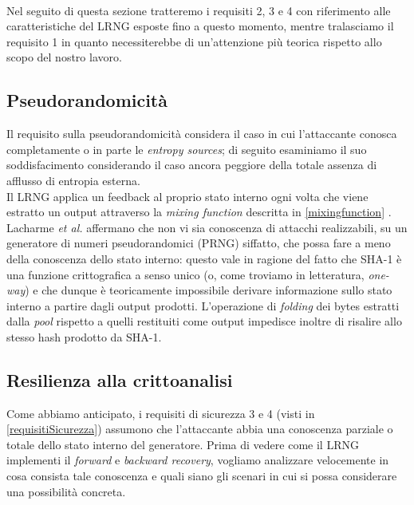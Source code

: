 \documentclass{article}
\begin{document}
 
 \paragraph{}Nel seguito di questa sezione tratteremo i requisiti 2, 3 e 4 con
 riferimento alle caratteristiche del LRNG esposte fino a questo momento,
 mentre tralasciamo il requisito 1 in quanto necessiterebbe di
 un'attenzione più teorica rispetto allo scopo del nostro lavoro.
 
 \subsection{Pseudorandomicità}
 Il requisito sulla pseudorandomicità considera il caso in cui l'attaccante
 conosca completamente o in parte le \emph{entropy sources}; di seguito
 esaminiamo il suo soddisfacimento considerando il caso ancora peggiore della
 totale assenza di afflusso di entropia esterna.\\
 Il LRNG applica un feedback al proprio stato interno ogni volta che viene
 estratto un output attraverso la \emph{mixing function} descritta in
 \ref{mixingfunction} . Lacharme \emph{et al.} affermano che non vi sia
 conoscenza di attacchi realizzabili, su un generatore di numeri pseudorandomici
 (PRNG) siffatto, che possa fare a meno della conoscenza dello stato interno:
 questo vale in ragione del fatto che SHA-1 è una funzione crittografica a senso
 unico (o, come troviamo in letteratura, \emph{one-way}) e che dunque è teoricamente
 impossibile derivare informazione sullo stato interno
 a partire dagli output prodotti. L'operazione di \emph{folding} dei bytes
 estratti dalla \emph{pool} rispetto a quelli restituiti come output impedisce
 inoltre di risalire allo stesso hash prodotto da SHA-1.
 
 \subsection{Resilienza alla crittoanalisi}
 Come abbiamo anticipato, i requisiti di sicurezza 3 e 4 (visti in
 \ref{requisitiSicurezza}) assumono che l'attaccante abbia una conoscenza
 parziale o totale dello stato interno del generatore. Prima di vedere come
 il LRNG implementi il \emph{forward} e \emph{backward recovery}, vogliamo
 analizzare velocemente in cosa consista tale conoscenza e quali siano gli
 scenari in cui si possa considerare una possibilità concreta.
 
\end{document}
